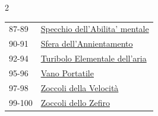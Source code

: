 \begin{multicols}{2}
{{\begin{tabularx}{\linewidth}{ll}
\rowcolor{gray!20}87-89 & \hyperlink{Specchio dell'Abilita' mentale}{Specchio dell'Abilita' mentale}\\
90-91 & \hyperlink{Sfera dell'Annientamento}{Sfera dell'Annientamento}\\
\rowcolor{gray!20}92-94 & \hyperlink{Turibolo Elementale dell'aria}{Turibolo Elementale dell'aria}\\
95-96 & \hyperlink{Vano Portatile}{Vano Portatile}\\
\rowcolor{gray!20}97-98 & \hyperlink{Zoccoli della Velocità}{Zoccoli della Velocità}\\
99-100 & \hyperlink{Zoccoli dello Zefiro}{Zoccoli dello Zefiro}
\end{tabularx}}

}

%

\end{multicols}

\pagebreak

